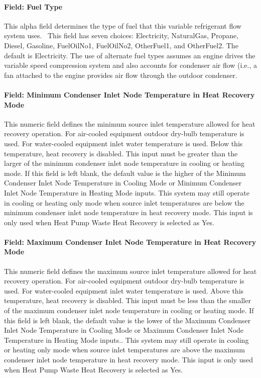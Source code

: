 \paragraph{Field: Fuel Type}\label{field-fuel-type-005}

This alpha field determines the type of fuel that this variable refrigerant flow system uses.~ This field has seven choices: Electricity, NaturalGas, Propane, Diesel, Gasoline, FuelOilNo1, FuelOilNo2, OtherFuel1, and OtherFuel2. The default is Electricity. The use of alternate fuel types assumes an engine drives the variable speed compression system and also accounts for condenser air flow (i.e., a fan attached to the engine provides air flow through the outdoor condenser.

\paragraph{Field: Minimum Condenser Inlet Node Temperature in Heat Recovery Mode}\label{field-minimum-condenser-inlet-node-temperature-in-heat-recovery-mode-000}

This numeric field defines the minimum source inlet temperature allowed for heat recovery operation. For air-cooled equipment outdoor dry-bulb temperature is used. For water-cooled equipment inlet water temperature is used. Below this temperature, heat recovery is disabled. This input must be greater than the larger of the minimum condenser inlet node temperature in cooling or heating mode. If this field is left blank, the default value is the higher of the Minimum Condenser Inlet Node Temperature in Cooling Mode or Minimum Condenser Inlet Node Temperature in Heating Mode inputs. This system may still operate in cooling or heating only mode when source inlet temperatures are below the minimum condenser inlet node temperature in heat recovery mode. This input is only used when Heat Pump Waste Heat Recovery is selected as Yes.

\paragraph{Field: Maximum Condenser Inlet Node Temperature in Heat Recovery Mode}\label{field-maximum-condenser-inlet-node-temperature-in-heat-recovery-mode-000}

This numeric field defines the maximum source inlet temperature allowed for heat recovery operation. For air-cooled equipment outdoor dry-bulb temperature is used. For water-cooled equipment inlet water temperature is used. Above this temperature, heat recovery is disabled. This input must be less than the smaller of the maximum condenser inlet node temperature in cooling or heating mode. If this field is left blank, the default value is the lower of the Maximum Condenser Inlet Node Temperature in Cooling Mode or Maximum Condenser Inlet Node Temperature in Heating Mode inputs.. This system may still operate in cooling or heating only mode when source inlet temperatures are above the maximum condenser inlet node temperature in heat recovery mode. This input is only used when Heat Pump Waste Heat Recovery is selected as Yes.

